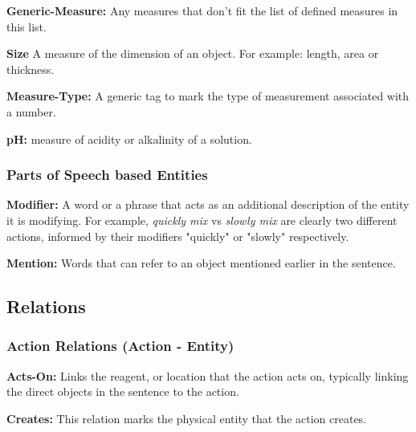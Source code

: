 \documentclass[11pt,a4paper]{article}
\begin{document}
\noindent
\textbf{Generic-Measure:} Any measures that don't fit the list of defined measures in this list.

\noindent
\textbf{Size} A measure of the dimension of an object. For example: length, area or thickness.

\noindent
\textbf{Measure-Type:} A generic tag to mark the type of measurement associated with a number.

\noindent
\textbf{pH:} measure of acidity or alkalinity of a solution. 

\subsubsection{Parts of Speech based Entities}

\noindent
\textbf{Modifier:} A word or a phrase that acts as an additional description of the entity it is modifying. 
For example, \textit{quickly mix} vs \textit{slowly mix} are clearly two different actions, informed by their modifiers "quickly" or "slowly" respectively.

\noindent
\textbf{Mention:} Words that can refer to an object mentioned earlier in the sentence. 



\subsection{Relations}

\subsubsection{Action Relations (Action - Entity)}

\noindent
\textbf{Acts-On:} Links the reagent, or location that the action acts on, typically linking the direct objects in the sentence to the action.

\noindent
\textbf{Creates:} This relation marks the physical entity that the action creates. 
\end{document}
